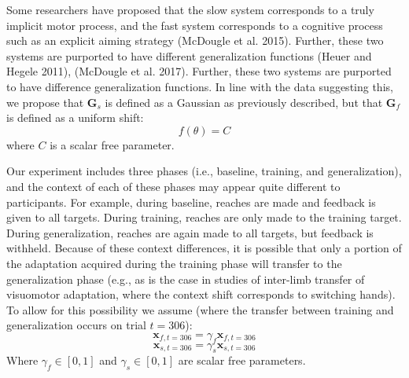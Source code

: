 \documentclass[jou, apacite, 11pt, longtable, floatsintext, notab]{apa6}
\begin{document}
Some researchers have proposed that the slow system
corresponds to a truly implicit motor process, and the fast
system corresponds to a cognitive process such as an
explicit aiming strategy (McDougle et al. 2015). Further,
these two systems are purported to have different
generalization functions (Heuer and Hegele 2011), (McDougle
et al. 2017). Further, these two systems are purported to
have difference generalization functions. In line with the
data suggesting this, we propose that $\boldsymbol{G}_{s}$
is defined as a Gaussian as previously described, but that
$\boldsymbol{G}_{f}$ is defined as a uniform shift:
\begin{equation}
  f(\theta) = C
\end{equation}
where $C$ is a scalar free parameter.

Our experiment includes three phases (i.e., baseline,
training, and generalization), and the context of each of
these phases may appear quite different to participants. For
example, during baseline, reaches are made and feedback is
given to all targets. During training, reaches are only made
to the training target. During generalization, reaches are
again made to all targets, but feedback is withheld. Because
of these context differences, it is possible that only a
portion of the adaptation acquired during the training phase
will transfer to the generalization phase (e.g., as is the
case in studies of inter-limb transfer of visuomotor
adaptation, where the context shift corresponds to switching
hands). To allow for this possibility we assume (where the
transfer between training and generalization occurs on trial
$t=306$):
\begin{equation}
  \boldsymbol{x}_{f, t=306} = \gamma_{f} \boldsymbol{x}_{f, t=306} 
\end{equation}
\begin{equation}
  \boldsymbol{x}_{s, t=306} = \gamma_{s} \boldsymbol{x}_{s, t=306} 
\end{equation}
Where $\gamma_{f} \in [0,1]$ and $\gamma_{s} \in [0,1]$ are
scalar free parameters. 
\end{document}
